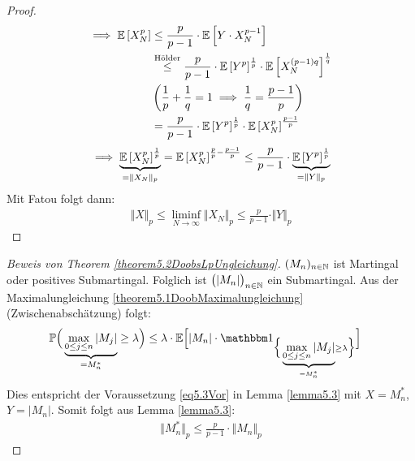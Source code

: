 \begin{proof}
\begin{align*}
\implies
\mathbb{E}\left[X_N^p\right]
&\leq \frac{p}{p-1}\cdot\mathbb{E}\left[Y\cdot X_N^{p-1}\right] \\
&\stackrel{\text{Hölder}}{\leq}
\frac{p}{p-1}\cdot\mathbb{E}\left[Y^p\right]^{\frac{1}{p}}\cdot\mathbb{E}\left[X_N^{(p-1)q}\right]^{\frac{1}{q}}\\
&\left(\frac{1}{p} + \frac{1}{q} = 1 \implies \frac{1}{q} = \frac{p-1}{p}\right) \\
&=\frac{p}{p-1}\cdot\mathbb{E}\left[Y^p\right]^{\frac{1}{p}}\cdot\mathbb{E}\left[X_N^{p}\right]^{\frac{p-1}{p}}
\end{align*}
\begin{align*}
\implies
\underbrace{\mathbb{E}\left[X_N^p\right]^{\frac{1}{p}}}_{=\Vert X_N\Vert_p}
=\mathbb{E}\left[X_N^p\right]^{\frac{p}{p}-\frac{p-1}{p}}
\leq
\frac{p}{p-1}\cdot\underbrace{\mathbb{E}\left[Y^p\right]^{\frac{1}{p}}}_{=\Vert Y\Vert_p}
\end{align*}
Mit Fatou folgt dann:
\begin{align*}
\Vert X\Vert_p\leq\liminf\limits_{N\to\infty}\Vert X_N\Vert_p\leq\frac{p}{p-1}\cdot\Vert Y\Vert_p
\end{align*}
\end{proof}

\begin{proof}[Beweis von Theorem \ref{theorem5.2DoobsLpUngleichung}]\enter
$(M_n)_{n\in\mathbb{N}}$ ist Martingal oder positives Submartingal. Folglich ist $\big(|M_n|\big)_{n\in\mathbb{N}}$ ein Submartingal. Aus der Maximalungleichung \ref{theorem5.1DoobMaximalungleichung} (Zwischenabschätzung) folgt:
\begin{align*}
\P\Big(\underbrace{\max\limits_{0\leq j\leq n}|M_j|}_{=M_n^\ast}\geq\lambda\Big)
&\leq\lambda\cdot\E\Big[|M_n|\cdot\indi_{\Big\lbrace\underbrace{\max\limits_{0\leq j\leq n}|M_j|}_{=M_n^\ast}\geq\lambda\Big\rbrace}\Big]
\end{align*}
Dies entspricht der Voraussetzung \eqref{eq5.3Vor} in Lemma \ref{lemma5.3} mit $X=M_n^\ast$, $Y=|M_n|$. Somit folgt aus Lemma \ref{lemma5.3}:
\begin{align*}
\big\Vert M_n^\ast\big\Vert_p\leq\frac{p}{p-1}\cdot\big\Vert M_n\big\Vert_p
\end{align*}
\end{proof}

